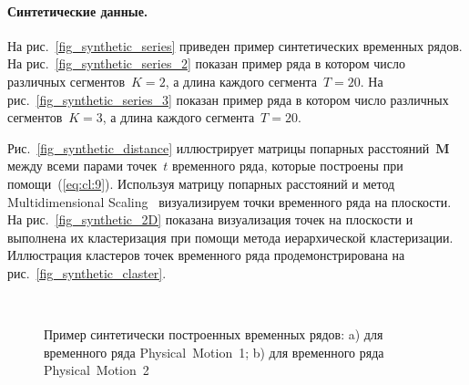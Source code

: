 \documentclass[12pt, twoside]{article}
\numberwithin{equation}{section}
\begin{document}
\paragraph{Синтетические данные.}


На рис.~\ref{fig_synthetic_series} приведен пример синтетических временных рядов. 
На рис.~\ref{fig_synthetic_series_2} показан пример ряда в котором число различных сегментов~$K = 2$, а длина каждого сегмента~$T = 20$. 
На рис.~\ref{fig_synthetic_series_3} показан пример ряда в котором число различных сегментов~$K = 3$, а длина каждого сегмента~$T = 20$. 

Рис.~\ref{fig_synthetic_distance} иллюстрирует матрицы попарных расстояний~$\textbf{M}$ между всеми парами точек~$t$ временного ряда, которые построены при помощи~(\ref{eq:cl:9}). 
Используя матрицу попарных расстояний и метод Multidimensional Scaling~\cite{Borg2005} визуализируем точки временного ряда на плоскости. 
На рис.~\ref{fig_synthetic_2D} показана визуализация точек на плоскости и выполнена их кластеризация при помощи метода иерархической кластеризации. 
Иллюстрация кластеров точек временного ряда продемонстрирована на рис.~\ref{fig_synthetic_claster}.

\begin{figure}[h!t]\center
{}
\\
\caption{Пример синтетически построенных временных рядов: a) для временного ряда Physical~Motion~1; b) для временного ряда Physical~Motion~2}
\label{fig_real_series}
\end{figure}
\end{document}
